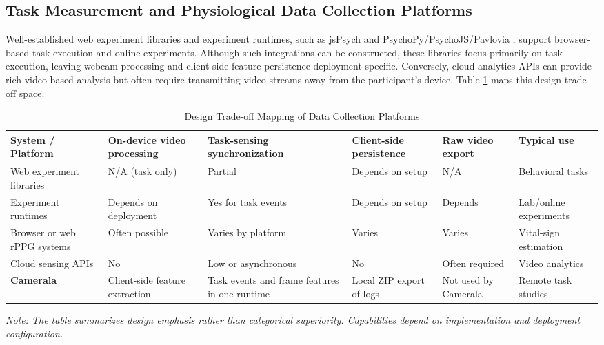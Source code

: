 \documentclass[dvipdfmx]{ehis}
\begin{document}
\subsection{Task Measurement and Physiological Data Collection Platforms}
Well-established web experiment libraries and experiment runtimes, such as jsPsych \cite{jspsych_joss} and PsychoPy/PsychoJS/Pavlovia \cite{psychopy2}, support browser-based task execution and online experiments.
Although such integrations can be constructed, these libraries focus primarily on task execution, leaving webcam processing and client-side feature persistence deployment-specific.
Conversely, cloud analytics APIs can provide rich video-based analysis but often require transmitting video streams away from the participant's device.
Table \ref{tab:related_work} maps this design trade-off space.

\begin{table}[t]
    \begin{center}
    \caption{Design Trade-off Mapping of Data Collection Platforms}
\label{tab:related_work}
\scriptsize
\setlength{\tabcolsep}{2pt}
\begin{tabular}{p{}p{}p{}p{}p{}p{}}
\toprule
\textbf{System / Platform} & \textbf{On-device video processing} & \textbf{Task-sensing synchronization} & \textbf{Client-side persistence} & \textbf{Raw video export} & \textbf{Typical use} \\
\midrule
Web experiment libraries & N/A (task only) & Partial & Depends on setup & N/A & Behavioral tasks \\
Experiment runtimes & Depends on deployment & Yes for task events & Depends on setup & Depends & Lab/online experiments \\
Browser or web rPPG systems & Often possible & Varies by platform & Varies & Varies & Vital-sign estimation \\
Cloud sensing APIs & No & Low or asynchronous & No & Often required & Video analytics \\
\textbf{Camerala} & Client-side feature extraction & Task events and frame features in one runtime & Local ZIP export of logs & Not used by Camerala & Remote task studies \\
\bottomrule
\end{tabular}
\vspace{1mm}

\scriptsize{\textit{Note: The table summarizes design emphasis rather than categorical superiority. Capabilities depend on implementation and deployment configuration.}}
\end{center}
\end{table}
\end{document}
